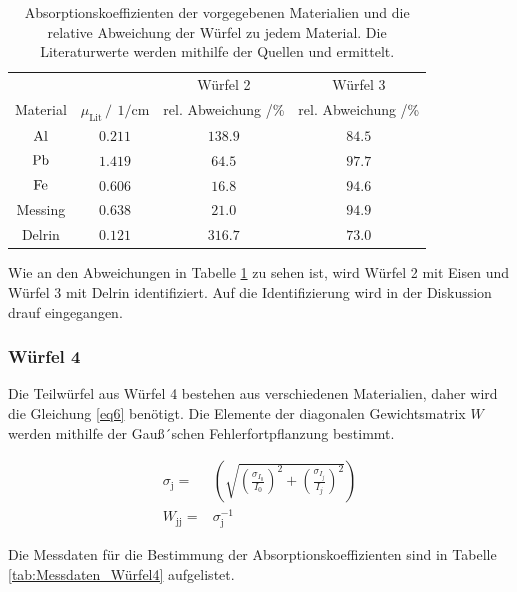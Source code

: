 \FloatBarrier
\begin{table}
    \centering
    \caption{Absorptionskoeffizienten der vorgegebenen Materialien und die relative Abweichung der Würfel zu jedem Material. Die 
    Literaturwerte werden mithilfe der Quellen \cite{Massenkoef} und \cite{Dichte} ermittelt.}
    \label{tab:Abweichung23}
    \begin{tabular}{c c c c}
        \toprule
        &&Würfel 2& Würfel 3\\
        \cmidrule(lr){3-3}\cmidrule(lr){4-4}
        Material&$\mu_{\text{Lit}}\,/\,\SI{}{1\per\centi\meter}$&rel. Abweichung /\%&rel. Abweichung /\%\\
        \midrule
        $\ce{Al}$&$\num{0.211}$&$\num{138.9}$&$\num{84.5}$\\
        $\ce{Pb}$&$\num{1.419}$&$\num{64.5}$&$\num{97.7}$\\
        $\ce{Fe}$&$\num{0.606}$&$\num{16.8}$&$\num{94.6}$\\
        Messing  &$\num{0.638}$&$\num{21.0}$&$\num{94.9}$\\ 
        Delrin   &$\num{0.121}$&$\num{316.7}$&$\num{73.0}$\\
        \bottomrule
    \end{tabular}
\end{table}
\FloatBarrier

Wie an den Abweichungen in Tabelle \ref{tab:Abweichung23} zu sehen ist, wird Würfel 2 mit Eisen und Würfel 3 mit Delrin identifiziert. Auf die 
Identifizierung wird in der Diskussion drauf eingegangen.

\subsubsection{Würfel 4}

Die Teilwürfel aus Würfel 4 bestehen aus verschiedenen Materialien, daher wird die Gleichung \ref{eq6} benötigt.
Die Elemente der diagonalen Gewichtsmatrix $W$ werden mithilfe der Gauß´schen Fehlerfortpflanzung bestimmt.

\begin{align*}
    \sigma_{\text{j}}=& \left(\sqrt{\left(\frac{\sigma_{I_0}}{I_0}\right)^2+ \left(\frac{\sigma_{I_j}}{I_j}\right)^2}\right)\\
    W_{\text{jj}}=& \sigma_{\text{j}}^{-1}
\end{align*}

Die Messdaten für die Bestimmung der Absorptionskoeffizienten sind in Tabelle \ref{tab:Messdaten_Würfel4} aufgelistet.

